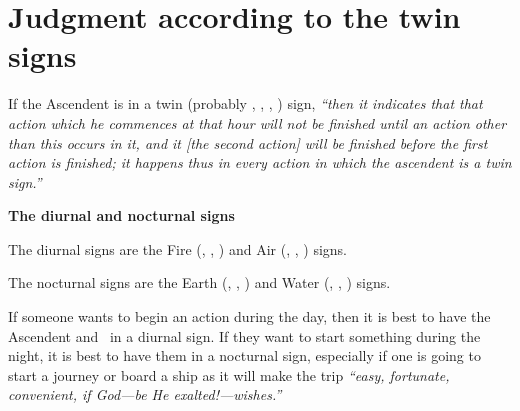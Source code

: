\section{Judgment according to the twin signs}
If the Ascendent is in a twin (probably \Gemini, \Virgo, \Sagittarius, \Pisces) sign, \textsl{``then it indicates that that action which he commences at that hour will not be finished until an action other than this occurs in it, and it [the second action] will be finished before the first action is finished; it happens thus in every action in which the ascendent is a twin sign.''}

\textbf{The diurnal and nocturnal signs}

The diurnal signs are the Fire (\Aries, \Leo, \Sagittarius) and Air (\Gemini, \Libra, \Aquarius) signs.

The nocturnal signs are the Earth (\Taurus, \Virgo, \Capricorn) and Water (\Cancer, \Scorpio, \Pisces) signs.

If someone wants to begin an action during the day, then it is best to have the Ascendent and \Moon\, in a diurnal sign. If they want to start something during the night, it is best to have them in a nocturnal sign, especially if one is going to start a journey or board a ship as it will make the trip \textsl{``easy, fortunate, convenient, if God---be He exalted!---wishes.''}







